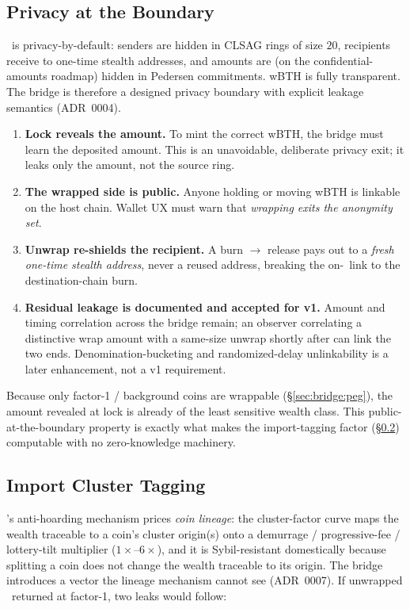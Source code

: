 \subsection{Privacy at the Boundary}
\label{sec:bridge:privacy}

\Botho\ is privacy-by-default: senders are hidden in CLSAG rings of size
$20$,
recipients receive to one-time stealth addresses, and amounts are (on the
confidential-amounts roadmap) hidden in Pedersen commitments. wBTH is fully
transparent. The bridge is therefore a designed privacy boundary with explicit
leakage semantics (ADR~0004).

\begin{enumerate}
  \item \textbf{Lock reveals the amount.} To mint the correct wBTH, the bridge
    must learn the deposited amount. This is an unavoidable, deliberate privacy
    exit; it leaks only the amount, not the source ring.
  \item \textbf{The wrapped side is public.} Anyone holding or moving wBTH is
    linkable on the host chain. Wallet UX must warn that \emph{wrapping exits
    the anonymity set}.
  \item \textbf{Unwrap re-shields the recipient.} A burn $\to$ release pays out
    to a \emph{fresh one-time stealth address}, never a reused address, breaking
    the on-\Botho\ link to the destination-chain burn.
  \item \textbf{Residual leakage is documented and accepted for v1.} Amount and
    timing correlation across the bridge remain; an observer correlating a
    distinctive wrap amount with a same-size unwrap shortly after can link the
    two ends. Denomination-bucketing and randomized-delay unlinkability is a
    later enhancement, not a v1 requirement.
\end{enumerate}

Because only factor-1 / background coins are wrappable
(\S\ref{sec:bridge:peg}), the amount revealed at lock is already of the least
sensitive wealth class. This public-at-the-boundary property is exactly what
makes the import-tagging factor (\S\ref{sec:bridge:import}) computable with no
zero-knowledge machinery.

\subsection{Import Cluster Tagging}
\label{sec:bridge:import}

\Botho's anti-hoarding mechanism prices \emph{coin lineage}: the cluster-factor
curve maps the wealth traceable to a coin's cluster origin(s) onto a
demurrage / progressive-fee / lottery-tilt multiplier ($1\times$--$6\times$),
and it is Sybil-resistant domestically because splitting a coin does not change
the wealth traceable to its origin. The bridge introduces a vector the lineage
mechanism cannot see (ADR~0007). If unwrapped \BTH\ returned at factor-1, two
leaks would follow:

